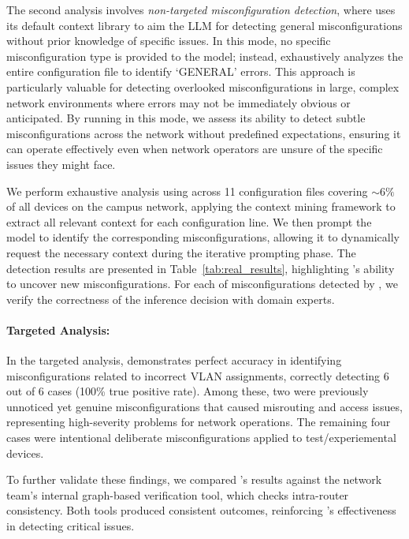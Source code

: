 The second analysis involves \textit{non-targeted misconfiguration detection}, where \sysname{} uses its default context library to aim the LLM for detecting general misconfigurations without prior knowledge of specific issues. In this mode, no specific misconfiguration type is provided to the model; instead, \sysname{} exhaustively analyzes the entire configuration file to identify `GENERAL' errors. 
This approach is particularly valuable for detecting overlooked misconfigurations in large, complex network environments where errors may not be immediately obvious or anticipated. By running \sysname{} in this mode, we assess its ability to detect subtle misconfigurations across the network without predefined expectations, ensuring it can operate effectively even when network operators are unsure of the specific issues they might face.

We perform exhaustive analysis using \sysname{} across 11 configuration files covering $\sim6\%$ of all devices on the campus network, applying the context mining framework to extract all relevant context for each configuration line. We then prompt the model to identify the corresponding misconfigurations, allowing it to dynamically request the necessary context during the iterative prompting phase. The detection results are presented in Table~\ref{tab:real_results}, highlighting \sysname{}'s ability to uncover new misconfigurations. For each of misconfigurations detected by \sysname{}, we verify the correctness of the inference decision with domain experts. 

\paragraph{Targeted Analysis:} 
In the targeted analysis, \sysname{} demonstrates perfect accuracy in identifying misconfigurations related to incorrect VLAN assignments, correctly detecting 6 out of 6 cases (100\% true positive rate). Among these, two were previously unnoticed yet genuine misconfigurations that caused misrouting and access issues, representing high-severity problems for network operations.
The remaining four cases were intentional deliberate misconfigurations applied to test/experiemental devices.

To further validate these findings, we compared \sysname{}'s results against the network team’s internal graph-based verification tool, which checks intra-router consistency. Both tools produced consistent outcomes, reinforcing \sysname{}'s effectiveness in detecting critical issues.




